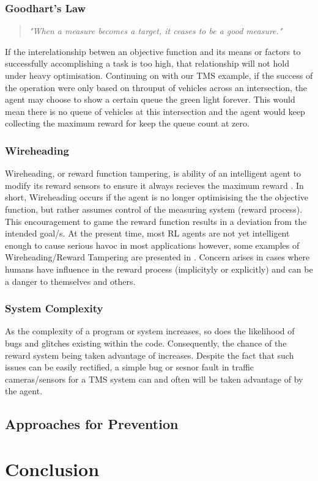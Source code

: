 \documentclass[a4paper,12pt]{report}
\begin{document}
\subsection{Goodhart's Law}
\begin{quotation}
    \textit{"When a measure becomes a target, it ceases to be a good measure."}
\end{quotation}
If the interelationship betwen an objective function and its means or factors to successfully accomplishing a task is too high,
that relationship will not hold under heavy optimisation. 
Continuing on with our TMS example, if the success of the operation were only based on throuput of vehicles across an intersection,
the agent may choose to show a certain queue the green light forever. 
This would mean there is no queue of vehicles at this intersection and the agent would keep collecting the maximum reward for keep the queue count at zero.

\subsection{Wireheading}
Wireheading, or reward function tampering, is ability of an intelligent agent to modify its reward sensors to ensure it always recieves the maximum reward \cite{JOO2020324}. 
In short, Wireheading occurs if the agent is no longer optimisising the the objective function, but rather assumes control of the measuring system (reward process).
This encouragement to game the reward function results in a deviation from the intended goal/s. 
At the present time, most RL agents are not yet intelligent enough to cause serious havoc in most applications however, some examples of Wireheading/Reward Tampering are presented in \cite{DBLP:journals/corr/abs-1908-04734}.  
Concern arises in cases where humans have influence in the reward process (implicityly or explicitly) and can be a danger to themselves and others.

\subsection{System Complexity}
As the complexity of a program or system increases, so does the likelihood of bugs and glitches existing within the code.
Consequently, the chance of the reward system being taken advantage of increases. 
Despite the fact that such issues can be easily rectified, a simple bug or sesnor fault in traffic cameras/sensors  for a TMS system can and often will be taken advantage of by the agent. 

\section{Approaches for Prevention}

\chapter{Conclusion}

\renewcommand{\bibname}{References}


\end{document}
